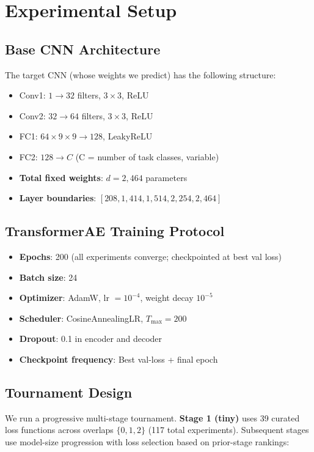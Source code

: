 \section{Experimental Setup}
\label{sec:experiments}

\subsection{Base CNN Architecture}

The target CNN (whose weights we predict) has the following structure:
\begin{itemize}
    \item Conv1: $1\to32$ filters, $3\times3$, ReLU
    \item Conv2: $32\to64$ filters, $3\times3$, ReLU
    \item FC1: $64\times9\times9 \to 128$, LeakyReLU
    \item FC2: $128 \to C$ (C = number of task classes, variable)
    \item \textbf{Total fixed weights}: $d = 2{,}464$ parameters
    \item \textbf{Layer boundaries}: $[208, 1{,}414, 1{,}514, 2{,}254, 2{,}464]$
\end{itemize}

\subsection{TransformerAE Training Protocol}

\begin{itemize}
    \item \textbf{Epochs}: 200 (all experiments converge; checkpointed at best val loss)
    \item \textbf{Batch size}: 24
    \item \textbf{Optimizer}: AdamW, lr $= 10^{-4}$, weight decay $10^{-5}$
    \item \textbf{Scheduler}: CosineAnnealingLR, $T_{\max}=200$
    \item \textbf{Dropout}: 0.1 in encoder and decoder
    \item \textbf{Checkpoint frequency}: Best val-loss + final epoch
\end{itemize}

\subsection{Tournament Design}

We run a progressive multi-stage tournament. \textbf{Stage 1 (tiny)} uses 39 curated loss functions across overlaps $\{0,1,2\}$ (117 total experiments). Subsequent stages use model-size progression with loss selection based on prior-stage rankings:

